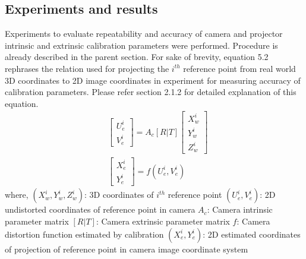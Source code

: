 \subsection{Experiments and results}
Experiments to evaluate repeatability and accuracy of camera and projector intrinsic and extrinsic calibration parameters were performed. Procedure is already described in the parent section. For sake of brevity, equation 5.2 rephrases the relation used for projecting the $i^{th}$ reference point from real world 3D coordinates to 2D image coordinates in experiment for measuring accuracy of calibration parameters. Please refer section 2.1.2 for detailed explanation of this equation.
\begin{equation}
\begin{aligned}
& \begin{bmatrix}
U_e^i \\
V_e^i
\end{bmatrix} 
=A_c[R|T]\begin{bmatrix}
X_w^i \\
Y_w^i \\
Z_w^i
\end{bmatrix} \\
& \begin{bmatrix}
X_e^i \\
Y_e^i
\end{bmatrix}
=f(U_e^i,V_e^i)
\end{aligned}
\end{equation}
\noindent
where,\newline
$(X_w^i,Y_w^i,Z_w^i)$: 3D coordinates of $i^{th}$ reference point\newline
$(U_e^i,V_e^i)$: 2D undistorted coordinates of reference point in camera \newline
$A_c$: Camera intrinsic parameter matrix \newline
$[R|T]$: Camera extrinsic parameter matrix \newline
$f$: Camera distortion function estimated by calibration\newline
$(X_e^i,Y_e^i)$: 2D estimated coordinates of projection of reference point in camera image coordinate system\newline 
\noindent

